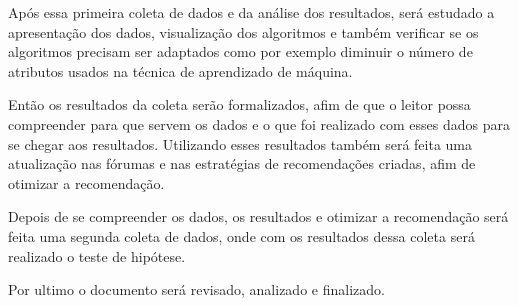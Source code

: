 Após essa primeira coleta de dados e da análise dos resultados, será
estudado a apresentação dos dados, visualização dos algoritmos e também
verificar se os algoritmos precisam ser adaptados como por exemplo
diminuir o número de atributos usados na técnica de aprendizado de máquina.

Então os resultados da coleta serão formalizados, afim de que o leitor
possa compreender para que servem os dados e o que foi realizado com esses
dados para se chegar aos resultados. Utilizando esses resultados também
será feita uma atualização nas fórumas e nas estratégias de recomendações
criadas, afim de otimizar a recomendação.

Depois de se compreender os dados, os resultados e otimizar a recomendação
será feita uma segunda coleta de dados, onde com os resultados dessa coleta
será realizado o teste de hipótese.

Por ultimo o documento será revisado, analizado e finalizado.
